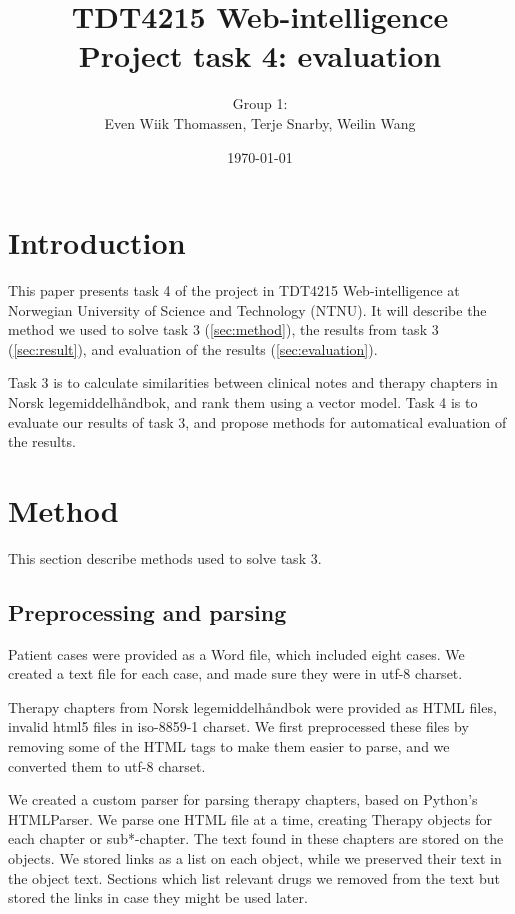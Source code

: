 \documentclass[a4paper, 12pt]{article}
\title{TDT4215 Web-intelligence\\Project task 4: evaluation}
\author{Group 1:\\Even Wiik Thomassen, Terje Snarby, Weilin Wang}
\date{\today}
\begin{document}

\maketitle
\tableofcontents


\section{Introduction}
This paper presents task 4 of the project in TDT4215 Web-intelligence at
Norwegian University of Science and Technology (NTNU). It will
describe the method we used to solve task 3 (\autoref{sec:method}),
the results from task 3 (\autoref{sec:result}),
and evaluation of the results (\autoref{sec:evaluation}).

Task 3 is to calculate similarities between clinical notes and therapy
chapters in Norsk legemiddelhåndbok, and rank them using a vector model.
Task 4 is to evaluate our results of task 3, and propose methods for
automatical evaluation of the results.


\section{Method}
\label{sec:method}
This section describe methods used to solve task 3.

\subsection{Preprocessing and parsing}
Patient cases were provided as a Word file, which included eight cases. We
created a text file for each case, and made sure they were in utf-8 charset.

Therapy chapters from Norsk legemiddelhåndbok were provided as HTML files,
invalid html5 files in iso-8859-1 charset. We first preprocessed these files
by removing some of the HTML tags to make them easier to parse, and we
converted them to utf-8 charset.

We created a custom parser for parsing therapy chapters, based on Python's
HTMLParser. We parse one HTML file at a time, creating Therapy objects for
each chapter or sub*-chapter. The text found in these chapters are stored
on the objects. We stored links as a list on each object, while we preserved
their text in the object text. Sections which list relevant drugs we removed
from the text but stored the links in case they might be used later.
\end{document}
